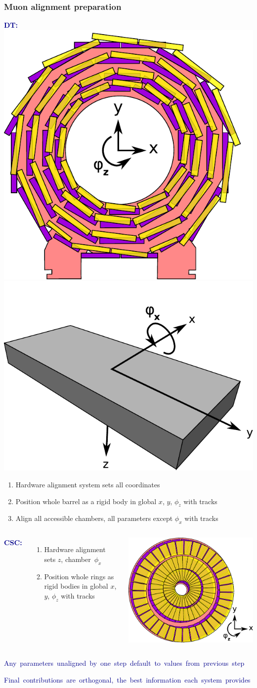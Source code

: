 \documentclass[compress]{beamer}
\begin{document}
\begin{frame}
\frametitle{Muon alignment preparation}

\textcolor{darkblue}{\Large \bf DT:} \hfill \includegraphics[height=2.3 cm]{global_dt.pdf} \hfill \includegraphics[height=2.3 cm]{dt_coordinates.pdf}

\begin{enumerate}
\item Hardware alignment system sets all coordinates
\item Position whole barrel as a rigid body in global $x$, $y$, $\phi_z$ with tracks
\item Align all accessible chambers, all parameters except $\phi_x$ with tracks
\end{enumerate}

\begin{columns}
\textcolor{darkblue}{\Large \bf CSC:}
\begin{enumerate}
\item Hardware alignment sets $z$, \mbox{chamber $\phi_x$\hspace{-1 cm}}
\item Position whole rings as rigid bodies in global $x$, $y$, $\phi_z$ with tracks
\end{enumerate}

\includegraphics[height=2.3 cm]{global_csc.pdf}
\end{columns}

\vspace{0.5 cm}
\textcolor{darkblue}{\mbox{Any parameters unaligned by one step default to values from previous step\hspace{-1 cm}}}

\textcolor{darkblue}{\mbox{Final contributions are orthogonal, the best information each system provides\hspace{-1 cm}}}
\end{frame}
\end{document}
